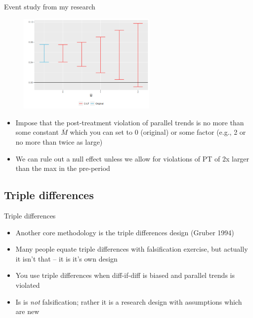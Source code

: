 \documentclass{beamer}
\begin{document}
\begin{frame}{Event study from my research}
    \begin{figure}
        \centering
        \includegraphics[width=0.6\textwidth, height=0.6\textheight, keepaspectratio]{./lecture_includes/bounding_miller.png}
    \end{figure}
    \begin{itemize}
	\item Impose that the post-treatment violation of parallel trends is no more than some constant $\overline{M}$ which you can set to 0 (original) or some factor (e.g., 2 or no more than twice as large)
	\item We can rule out a null effect unless we allow for violations of PT of 2x larger than the max in the pre-period
    \end{itemize}
\end{frame}






\subsection{Triple differences}


\begin{frame}{Triple differences}

\begin{itemize}
\item Another core methodology is the triple differences design (Gruber 1994)
\item Many people equate triple differences with falsification exercise, but actually it isn't that -- it is it's own design
\item You use triple differences when diff-if-diff is biased and parallel trends is violated
\item Is is \emph{not} falsification; rather it is a research design with assumptions which are new
\end{itemize}

\end{frame}
\end{document}
